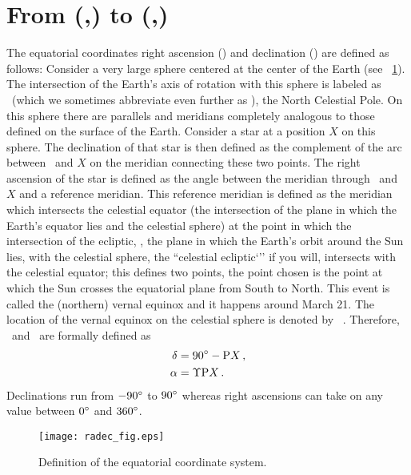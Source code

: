 
\section{From (\ra,\dec) to (\gall,\galb)}

The equatorial coordinates right ascension (\ra) and declination
(\dec) are defined as follows: Consider a very large sphere centered
at the center of the Earth (see \figurename~\ref{fig:eq}). The
intersection of the Earth's axis of rotation with this sphere is
labeled as \ncp\ (which we sometimes abbreviate even further as
\ncpp), the North Celestial Pole. On this sphere there are parallels
and meridians completely analogous to those defined on the surface of
the Earth. Consider a star at a position $X$ on this sphere. The
declination of that star is then defined as the complement of the arc
between \ncp\ and $X$ on the meridian connecting these two points. The
right ascension of the star is defined as the angle between the
meridian through \ncp\ and $X$ and a reference meridian. This
reference meridian is defined as the meridian which intersects the
celestial equator (the intersection of the plane in which the Earth's
equator lies and the celestial sphere) at the point in which the
intersection of the ecliptic, \ie, the plane in which the Earth's
orbit around the Sun lies, with the celestial sphere, the ``celestial
ecliptic`'' if you will, intersects with the celestial equator; this
defines two points, the point chosen is the point at which the Sun
crosses the equatorial plane from South to North. This event is called
the (northern) vernal equinox and it happens around March 21. The
location of the vernal equinox on the celestial sphere is denoted by
\vernal\ \citep[][pp.14-6]{Green85a}. Therefore, \ra\ and \dec\ are
formally defined as
\begin{align}
\delta &= 90^{\circ} - \textnormal{P} X\, ,\\
\alpha &= \Upsilon \textnormal{P} X \, .
\end{align}
Declinations run from $-90^{\circ}$ to $90^{\circ}$ whereas right
ascensions can take on any value between $0^{\circ}$ and $360^{\circ}$.

\begin{figure}[htp]
\begin{center}
\texttt{[image: radec\_fig.eps]}
\caption{Definition of the equatorial coordinate system.}\label{fig:eq}
\end{center}
\end{figure}

